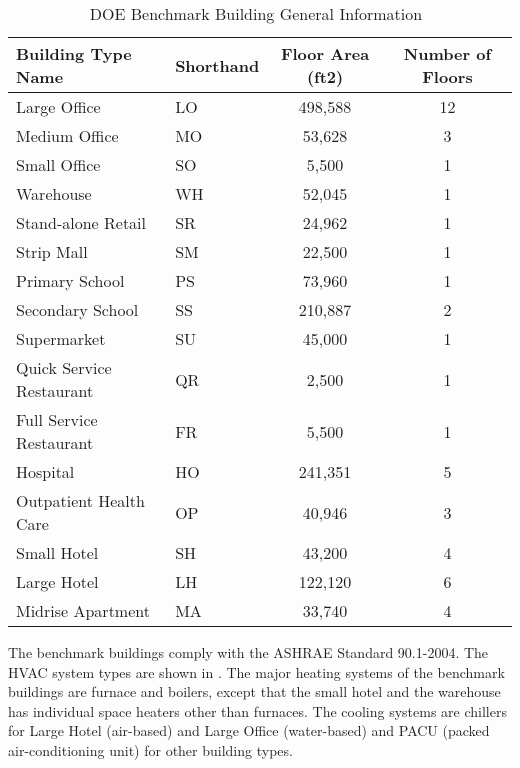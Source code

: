 \begin{table}[h!]
  \centering
  \begin{tabular}{l|l|c|c}
    \hline
Building Type Name&Shorthand&  Floor Area (ft2)    & Number of Floors\\
    \hline
Large Office	         &LO&  498,588	      & 12\\
Medium Office	         &MO&  53,628	      & 3\\
Small Office	         &SO&  5,500	      & 1\\
Warehouse	         &WH&  52,045	      & 1\\
Stand-alone Retail       &SR&  24,962	      & 1\\
Strip Mall	         &SM&  22,500	      & 1\\
Primary School	         &PS&  73,960	      & 1\\
Secondary School         &SS&  210,887	      & 2\\
Supermarket	         &SU&  45,000	      & 1\\
Quick Service Restaurant &QR&  2,500          & 1\\
Full Service Restaurant  &FR&  5,500          & 1\\
Hospital	         &HO&  241,351	      & 5\\
Outpatient Health Care   &OP&  40,946	      & 3\\
Small Hotel	         &SH&  43,200	      & 4\\
Large Hotel	         &LH&  122,120	      & 6\\
Midrise Apartment        &MA&  33,740	      & 4\\
    \hline
\end{tabular}
\caption{DOE Benchmark Building General Information~\cite{DOE2015}}
\label{tab:doeModel}
\end{table}

The benchmark buildings comply with the ASHRAE Standard 90.1-2004. The
HVAC system types are shown in . The major heating
systems of the benchmark buildings are furnace and boilers, except
that the small hotel and the warehouse has individual space heaters
other than furnaces. The cooling systems are chillers for Large Hotel
(air-based) and Large Office (water-based) and PACU (packed
air-conditioning unit) for other building types.~

